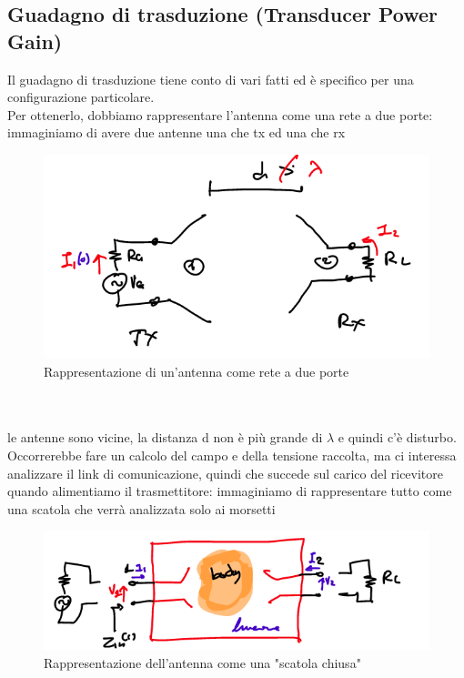 \documentclass[oneside, 12pt]{extbook}
\begin{document}
\subsection{Guadagno di trasduzione (Transducer Power Gain)}
Il guadagno di trasduzione tiene conto di vari fatti ed è specifico per una configurazione particolare.\\Per ottenerlo, dobbiamo rappresentare l'antenna come una rete a due porte: immaginiamo di avere due antenne una che tx ed una che rx\\
\begin{figure}
	\includegraphics[scale=0.5]{immagini/rete_dp.png}
	\caption{Rappresentazione di un'antenna come rete a due porte}
\end{figure}
\\\\le antenne sono vicine, la distanza d non è più grande di $\lambda$ e quindi c'è disturbo.\\Occorrerebbe fare un calcolo del campo e della tensione raccolta, ma ci interessa analizzare il link di comunicazione, quindi che succede sul carico del ricevitore quando alimentiamo il trasmettitore: immaginiamo di rappresentare tutto come una scatola che verrà analizzata solo ai morsetti\\
\begin{figure}
	\includegraphics[scale=0.5]{immagini/antenna_scatola.png}
	\caption{Rappresentazione dell'antenna come una "scatola chiusa"}
\end{figure}
\end{document}
